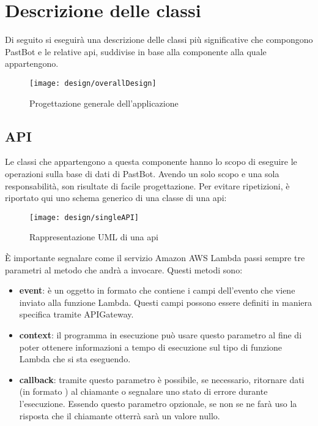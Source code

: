 \section{Descrizione delle classi}
Di seguito si eseguirà una descrizione delle classi più significative che
compongono PastBot e le relative \gls{api}, suddivise in base alla componente
alla quale appartengono.

\begin{figure}[H]
  \centering
  \texttt{[image: design/overallDesign]}
  \caption{Progettazione generale dell'applicazione}
\end{figure}

\subsection{API}
\label{design:api}

Le classi che appartengono a questa componente hanno lo scopo di eseguire le
operazioni sulla base di dati di PastBot. Avendo un solo scopo e una sola
responsabilità, son risultate di facile progettazione.
Per evitare ripetizioni, è riportato qui uno schema generico di una classe
di una \gls{api}:

\begin{figure}[H]
  \centering
  \texttt{[image: design/singleAPI]}
  \caption{Rappresentazione UML di una \gls{api}}
\end{figure}

\label{design:api:params}
È importante segnalare come il servizio Amazon AWS Lambda passi sempre tre
parametri al metodo che andrà a invocare. Questi metodi sono:
\begin{itemize}
  \item \textbf{event}: è un oggetto in formato
 che contiene i campi dell'evento che
viene inviato alla funzione Lambda. Questi campi possono essere definiti in
maniera specifica tramite APIGateway.
  \item \textbf{context}: il programma in esecuzione può usare questo parametro
al fine di poter ottenere informazioni a tempo di esecuzione sul tipo di
funzione Lambda che si sta eseguendo.
  \item \textbf{callback}: tramite questo parametro è possibile, se necessario,
ritornare dati (in formato ) al
chiamante o segnalare uno stato di errore durante l'esecuzione. Essendo questo
parametro opzionale, se non se ne farà uso la risposta che il chiamante otterrà
sarà un valore nullo.
\end{itemize}

